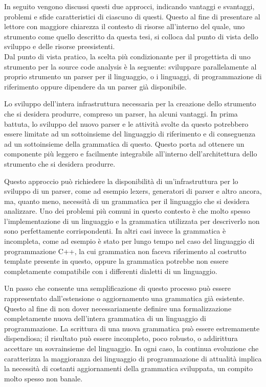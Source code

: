 In seguito vengono discussi questi due approcci, indicando vantaggi e
svantaggi, problemi e sfide caratteristici di ciascuno di questi. Questo al
fine di presentare al lettore con maggiore chiarezza il contesto di risorse
all’interno del quale, uno strumento come quello descritto da questa tesi, si
colloca dal punto di vista dello sviluppo e delle risorse preesistenti.\\

Dal punto di vista pratico, la scelta più condizionante per il progettista di
uno strumento per la source code analysis è la seguente: sviluppare
parallelamente al proprio strumento un parser per il linguaggio, o i linguaggi,
di programmazione di riferimento oppure dipendere da un parser già disponibile.

Lo sviluppo dell’intera infrastruttura necessaria per la creazione dello
strumento che si desidera produrre, compreso un parser, ha alcuni vantaggi. In
prima battuta, lo sviluppo del nuovo parser e le attività svolte da questo
potrebbero essere limitate ad un sottoinsieme del linguaggio di riferimento e di
conseguenza ad un sottoinsieme della grammatica di questo. Questo porta ad
ottenere un componente più leggero e facilmente integrabile all'interno
dell'architettura dello strumento che si desidera produrre.

Questo approccio può richiedere la disponibilità di un’infrastruttura per lo
sviluppo di un parser, come ad esempio lexers, generatori di parser e altro
ancora, ma, quanto meno, necessità di un grammatica per il linguaggio che si
desidera analizzare. Uno dei problemi più comuni in questo contesto è che molto
spesso l’implementazione di un linguaggio e la grammatica utilizzata per
descriverlo non sono perfettamente corrispondenti. In altri casi invece la
grammatica è incompleta, come ad esempio è stato per lungo tempo nel caso del
linguaggio di programmazione C++, la cui grammatica non faceva riferimento al
costrutto template presente in questo, oppure la grammatica potrebbe non essere
completamente compatibile con i differenti dialetti di un linguaggio.

Un passo che consente una semplificazione di questo processo può essere
rappresentato dall'estensione o aggiornamento una grammatica già esistente.
Questo al fine di non dover necessariamente definire una formalizzazione
completamente nuova dell'intera grammatica di un linguaggio di programmazione.
La scrittura di una nuova grammatica può essere estremamente dispendiosa; il
risultato può essere incompleto, poco robusto, o addirittura accettare un
sovrainsieme del linguaggio. In ogni caso, la continua evoluzione che
caratterizza la maggioranza dei linguaggio di programmazione di attualità
implica la necessità di costanti aggiornamenti della grammatica sviluppata, un
compito molto spesso non banale.\\

